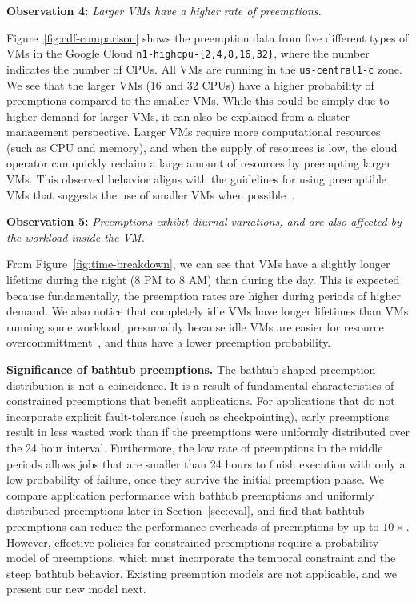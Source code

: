 \documentclass[compsoc]{IEEEtran}
\begin{document}
\noindent \textbf{Observation 4:}\emph{ Larger VMs have a higher rate of preemptions.}

Figure~\ref{fig:cdf-comparison} shows the preemption data from five different types of VMs in the Google Cloud \texttt{n1-highcpu-\{2,4,8,16,32\}}, where the number indicates the number of CPUs.
All VMs are running in the \texttt{us-central1-c} zone. 
We see that the larger VMs (16 and 32 CPUs) have a higher probability of preemptions compared to the smaller VMs.
While this could be simply due to higher demand for larger VMs, it can also be explained from a cluster management perspective. 
Larger VMs require more computational resources (such as CPU and memory), and when the supply of resources is low, the cloud operator can quickly reclaim a large amount of resources by preempting larger VMs.
This observed behavior aligns with the guidelines for using preemptible VMs that suggests the use of smaller VMs when possible~\cite{preemptible-documentation}. 

\noindent \textbf{Observation 5:} \emph{Preemptions exhibit diurnal variations, and are also affected by the workload inside the VM.}

From Figure~\ref{fig:time-breakdown}, we can see that VMs have a slightly longer lifetime during the night (8 PM to 8 AM) than during the day\footnotemark. 
This is expected because fundamentally, the preemption rates are higher during periods of higher demand. 
We also notice that completely idle VMs have longer lifetimes than VMs running some workload, presumably because idle VMs are easier for resource overcommittment~\cite{sharma19eurosys, fuerst2020cloud}, and thus have a lower preemption probability. 








\noindent \textbf{Significance of bathtub preemptions.} 
The bathtub shaped preemption distribution is not a coincidence.
It is a result of fundamental characteristics of constrained preemptions that benefit applications. 
For applications that do not incorporate explicit fault-tolerance (such as checkpointing), early preemptions result in less wasted work than if the preemptions were uniformly distributed over the 24 hour interval.
Furthermore, the low rate of preemptions in the middle periods allows jobs that are smaller than 24 hours to finish execution with only a low probability of failure, once they survive the initial preemption phase. 
We compare application performance with bathtub preemptions and uniformly distributed preemptions later in Section~\ref{sec:eval}, and find that bathtub preemptions can reduce the performance overheads of preemptions by up to $10\times$.
However, effective policies for constrained preemptions  require a probability model of preemptions, which must incorporate the temporal constraint and the steep bathtub behavior. 
Existing preemption models are not applicable, and we present our new model next. 
\end{document}
